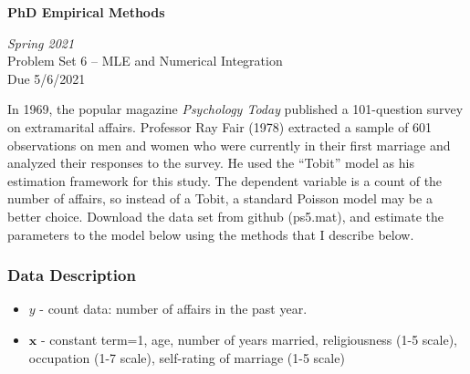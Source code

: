 \documentclass[10pt]{article}
\newcommand{\bs}{\boldsymbol}
\begin{document}
\begin{center}
\textbf{PhD Empirical Methods}

\emph{Spring 2021}\\[1em]

Problem Set 6 -- MLE and Numerical Integration\\
Due 5/6/2021\\[3em]
\end{center}












In 1969, the popular magazine \emph{Psychology Today} published a 101-question survey on extramarital affairs. Professor Ray Fair (1978) extracted a sample of 601 observations on men and women who were currently in their first marriage and analyzed their responses to the survey. He used the ``Tobit'' model as his estimation framework for this study. The dependent variable is a count of the number of affairs, so instead of a Tobit, a standard Poisson model may be a better choice. Download the data set from github (ps5.mat), and estimate the parameters to the model below using the methods that I describe below. 

\subsubsection*{Data Description} %
 \label{ssub:data_description}

 \begin{itemize}
 	\item $y$ - count data: number of affairs in the past year.
 	\item $\bs{x}$ - constant term=1, age, number of years married, religiousness (1-5 scale), occupation (1-7 scale), self-rating of marriage (1-5 scale)
 \end{itemize}
\end{document}
